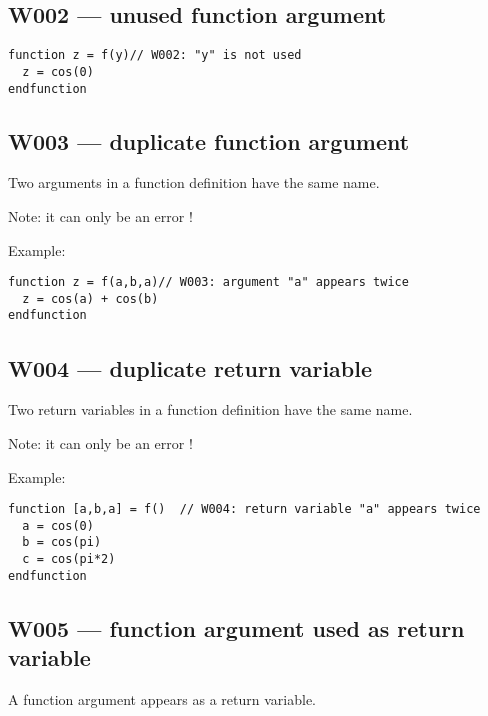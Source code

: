 \subsection{W002 --- unused function argument}


\begin{verbatim}
function z = f(y)// W002: "y" is not used
  z = cos(0)
endfunction
\end{verbatim}


\subsection{W003 --- duplicate function argument}




Two arguments in a function definition have the same name.



Note: it can only be an error !



Example:\begin{verbatim}
function z = f(a,b,a)// W003: argument "a" appears twice
  z = cos(a) + cos(b)
endfunction
\end{verbatim}




\subsection{W004 --- duplicate return variable  }




Two return variables in a function definition have the same name.



Note: it can only be an error !



Example:\begin{verbatim}
function [a,b,a] = f()  // W004: return variable "a" appears twice
  a = cos(0)
  b = cos(pi)
  c = cos(pi*2)
endfunction
\end{verbatim}




\subsection{W005 --- function argument used as return variable  }




A function argument appears as a return variable.



